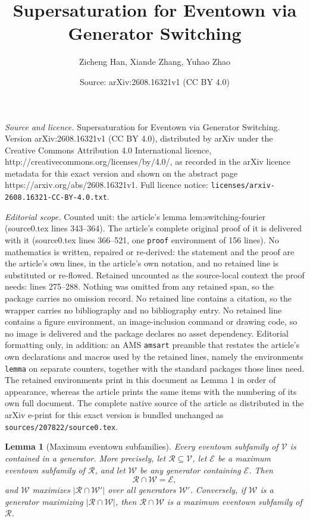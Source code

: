\documentclass[10pt,a4paper]{amsart}
\title{Supersaturation for Eventown via Generator Switching}
\author{Zicheng Han, Xiande Zhang, Yuhao Zhao}
\date{Source: arXiv:2608.16321v1 (CC BY 4.0)}
\newtheorem{lemma}{Lemma}
\begin{document}
\maketitle

\noindent\emph{Source and licence.} Supersaturation for Eventown via Generator Switching. Version arXiv:2608.16321v1 (CC BY 4.0), distributed by arXiv under the Creative Commons Attribution 4.0 International licence, http://creativecommons.org/licenses/by/4.0/, as recorded in the arXiv licence metadata for this exact version and shown on the abstract page https://arxiv.org/abs/2608.16321v1. Full licence notice: \texttt{licenses/arxiv-2608.16321-CC-BY-4.0.txt}.\par\smallskip

\noindent\textit{Editorial scope.} Counted unit: the article's lemma lem:switching-fourier (source0.tex lines 343--364). The article's complete original proof of it is delivered with it (source0.tex lines 366--521, one \texttt{proof} environment of 156 lines). No mathematics is written, repaired or re-derived: the statement and the proof are the article's own lines, in the article's own notation, and no retained line is substituted or re-flowed.  Retained uncounted as the source-local context the proof needs: lines 275--288.  Nothing was omitted from any retained span, so the package carries no omission record.  No retained line contains a citation, so the wrapper carries no bibliography and no bibliography entry.  No retained line contains a figure environment, an image-inclusion command or drawing code, so no image is delivered and the package declares no asset dependency.  Editorial formatting only, in addition: an AMS \texttt{amsart} preamble that restates the article's own declarations and macros used by the retained lines, namely the environments \texttt{lemma} on separate counters, together with the standard packages those lines need.  The retained environments print in this document as Lemma 1 in order of appearance, whereas the article prints the same items with the numbering of its own full document.  The complete native source of the article as distributed in the arXiv e-print for this exact version is bundled unchanged as \texttt{sources/207822/source0.tex}.
\begin{lemma}[Maximum eventown subfamilies]\label{lem:maximum-eventown}
Every eventown subfamily of \(\mathcal V\) is contained in a generator.  More
precisely, let \(\mathcal R\subseteq\mathcal V\), let \(\mathcal E\) be a
maximum eventown subfamily of \(\mathcal R\), and let \(\mathcal W\) be any
generator containing \(\mathcal E\).  Then
\[
 \mathcal R\cap\mathcal W=\mathcal E,
\]
and \(\mathcal W\) maximizes \(|\mathcal R\cap\mathcal W'|\) over all
generators \(\mathcal W'\).  Conversely, if \(\mathcal W\) is a generator
maximizing \(|\mathcal R\cap\mathcal W|\), then
\(\mathcal R\cap\mathcal W\) is a maximum eventown subfamily of
\(\mathcal R\).
\end{lemma}
\end{document}

